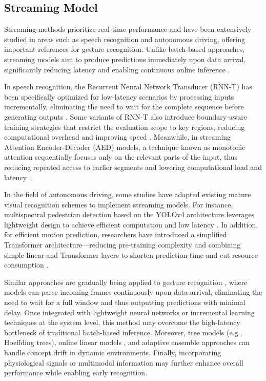 \subsection{Streaming Model}

Streaming methods prioritize real-time performance and have been extensively studied in areas such as speech recognition and autonomous driving, offering important references for gesture recognition. Unlike batch-based approaches, streaming models aim to produce predictions immediately upon data arrival, significantly reducing latency and enabling continuous online inference \cite{gomes2019machine, montiel2021river, lara2023data}.

In speech recognition, the Recurrent Neural Network Transducer (RNN-T) has been specifically optimized for low-latency scenarios by processing inputs incrementally, eliminating the need to wait for the complete sequence before generating outputs \cite{graves2012sequence}. Some variants of RNN-T also introduce boundary-aware training strategies that restrict the evaluation scope to key regions, reducing computational overhead and improving speed \cite{an2023bat}. Meanwhile, in streaming Attention Encoder-Decoder (AED) models, a technique known as monotonic attention sequentially focuses only on the relevant parts of the input, thus reducing repeated access to earlier segments and lowering computational load and latency \cite{chen2021developing}.

In the field of autonomous driving, some studies have adapted existing mature visual recognition schemes to implement streaming models. For instance, multispectral pedestrian detection based on the YOLOv4 architecture leverages lightweight design to achieve efficient computation and low latency \cite{s22031082}. In addition, for efficient motion prediction, researchers have introduced a simplified Transformer architecture—reducing pre-training complexity and combining simple linear and Transformer layers to shorten prediction time and cut resource consumption \cite{prutsch2024efficient}.

Similar approaches are gradually being applied to gesture recognition \cite{li2021gesture, devineau2018deep}, where models can parse incoming frames continuously upon data arrival, eliminating the need to wait for a full window and thus outputting predictions with minimal delay. Once integrated with lightweight neural networks or incremental learning techniques \cite{bifet2023machine, montiel2021river, lara2023data} at the system level, this method may overcome the high-latency bottleneck of traditional batch-based inference. Moreover, tree models (e.g., Hoeffding trees), online linear models \cite{montiel2021river}, and adaptive ensemble approaches can handle concept drift in dynamic environments. Finally, incorporating physiological signals \cite{saez2021gesture, bimbraw2024forearm, kim2023emg} or multimodal information \cite{rahim2024advanced, yaseen2024next, shen2021simulating} may further enhance overall performance while enabling early recognition.